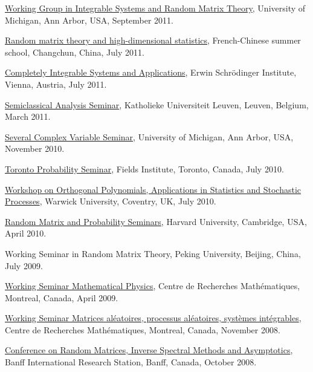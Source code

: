 \documentclass[12pt,a4paper]{article}
\newenvironment{item_list}{
 \begin{list}{}{
   \setlength{\leftmargin}{1.5em}
   \setlength{\itemsep}{0.25em}
   \setlength{\parskip}{0pt}
   \setlength{\parsep}{0.25em}
 }
}{
 \end{list}
}
\begin{document}
\begin{item_list}
\item
  \href{http://www.math.lsa.umich.edu/seminars_events/events.php?eventdefid=43&dt_begin=2011-07-01&dt_end=2011-12-31}{Working Group in Integrable Systems and Random Matrix Theory}, University of Michigan, Ann Arbor, USA, September 2011.
\item
  \href{http://web.hku.hk/~jeffyao/ss/}{Random matrix theory and high-dimensional statistics},  French-Chinese summer school, Changchun, China, July 2011.
\item
  \href{http://www.esf.org/activities/esf-conferences/details/2011/confdetail369.html}{Completely Integrable Systems and Applications}, Erwin Schr\"{o}dinger Institute, Vienna, Austria, July 2011.
\item
  \href{http://wis.kuleuven.be/analyse/seminar-classical.html}{Semiclassical Analysis Seminar}, Katholieke Universiteit Leuven, Leuven, Belgium, March 2011.
\item
  \href{http://www.math.lsa.umich.edu/seminars/scv/}{Several Complex Variable Seminar}, University of Michigan, Ann Arbor, USA, November 2010.
\item
  \href{http://www.math.utoronto.ca/cms/toronto-probability-seminar/}{Toronto Probability Seminar}, Fields Institute, Toronto, Canada, July 2010.
\item
  \href{http://www2.warwick.ac.uk/fac/sci/statistics/crism/workshops/orthogonal-polynomials/}{Workshop on Orthogonal Polynomials, Applications in Statistics and Stochastic Processes}, Warwick University, Coventry, UK, July 2010.
\item
  \href{http://www.math.harvard.edu/cgi-bin/showtalk.pl}{Random Matrix and Probability Seminars}, Harvard University, Cambridge, USA, April 2010.
\item
  Working Seminar in Random Matrix Theory, Peking University, Beijing, China, July 2009.
\item
  \href{http://www.crm.umontreal.ca/cal/en/mois200804.html}{Working Seminar Mathematical Physics}, Centre de Recherches Math\'{e}matiques, Montreal, Canada, April 2009.
\item
  \href{http://www.crm.umontreal.ca/cal/en/mois200811.html}{Working Seminar Matrices al\'{e}atoires, processus al\'{e}atoires, syst\`{e}mes int\'{e}grables}, Centre de Recherches Math\'{e}matiques, Montreal, Canada, November 2008.
\item
  \href{http://www.birs.ca/events/2008/5-day-workshops/08w5017}{Conference on Random Matrices, Inverse Spectral Methods and Asymptotics}, Banff International Research Station, Banff, Canada, October 2008.

\end{item_list}
\end{document}
